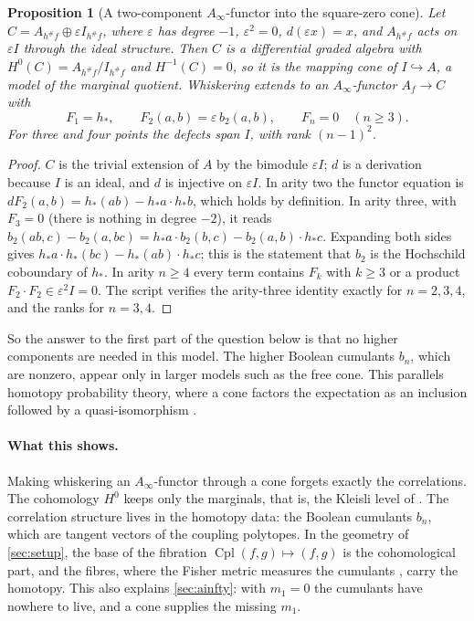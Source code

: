 \documentclass[11pt]{article}
\newtheorem{proposition}[theorem]{Proposition}
\theoremstyle{definition}
\theoremstyle{remark}
\newcommand{\Cpl}{\operatorname{Cpl}}
\begin{document}
\begin{proposition}[A two-component $A_\infty$-functor into the square-zero cone]\label{prop:sqzero}
Let $C=A_{h^\#f}\oplus\varepsilon I_{h^\#f}$, where $\varepsilon$ has degree $-1$, $\varepsilon^2=0$, $d(\varepsilon x)=x$, and
$A_{h^\#f}$ acts on $\varepsilon I$ through the ideal structure. Then $C$ is a differential graded algebra with
$H^0(C)=A_{h^\#f}/I_{h^\#f}$ and $H^{-1}(C)=0$, so it is the mapping cone of $I\hookrightarrow A$, a model of
the marginal quotient. Whiskering extends to an $A_\infty$-functor $A_f\to C$ with
\[
F_1=h_*,\qquad F_2(a,b)=\varepsilon\,b_2(a,b),\qquad F_n=0\quad(n\ge3).
\]
For three and four points the defects span $I$, with rank $(n-1)^2$.
\end{proposition}
\begin{proof}
$C$ is the trivial extension of $A$ by the bimodule $\varepsilon I$; $d$ is a derivation because $I$ is an ideal, and $d$
is injective on $\varepsilon I$. In arity two the functor equation is $dF_2(a,b)=h_*(ab)-h_*a\cdot h_*b$, which holds by
definition. In arity three, with $F_3=0$ (there is nothing in degree $-2$), it reads
$b_2(ab,c)-b_2(a,bc)=h_*a\cdot b_2(b,c)-b_2(a,b)\cdot h_*c$. Expanding both sides gives
$h_*a\cdot h_*(bc)-h_*(ab)\cdot h_*c$; this is the statement that $b_2$ is the Hochschild coboundary of $h_*$. In
arity $n\ge4$ every term contains $F_k$ with $k\ge3$ or a product $F_2\cdot F_2\in\varepsilon^2I=0$. The script verifies the
arity-three identity exactly for $n=2,3,4$, and the ranks for $n=3,4$.
\end{proof}

So the answer to the first part of the question below is that no higher components are needed in this
model. The higher Boolean cumulants $b_n$, which are nonzero, appear only in larger models such as the free
cone. This parallels homotopy probability theory, where a cone factors the expectation as an inclusion
followed by a quasi-isomorphism \cite{HPT1}.

\paragraph{What this shows.} Making whiskering an $A_\infty$-functor through a cone forgets exactly the
correlations. The cohomology $H^0$ keeps only the marginals, that is, the Kleisli level of
\cite{Conditionals}. The correlation structure lives in the homotopy data: the Boolean cumulants $b_n$, which
are tangent vectors of the coupling polytopes. In the geometry of \cref{sec:setup}, the base of the
fibration $\Cpl(f,g)\mapsto(f,g)$ is the cohomological part, and the fibres, where the Fisher metric
measures the cumulants \cite[Prop.~6.5]{Conditionals}, carry the homotopy. This also explains
\cref{sec:ainfty}: with $m_1=0$ the cumulants have nowhere to live, and a cone supplies the missing
$m_1$.
\end{document}
